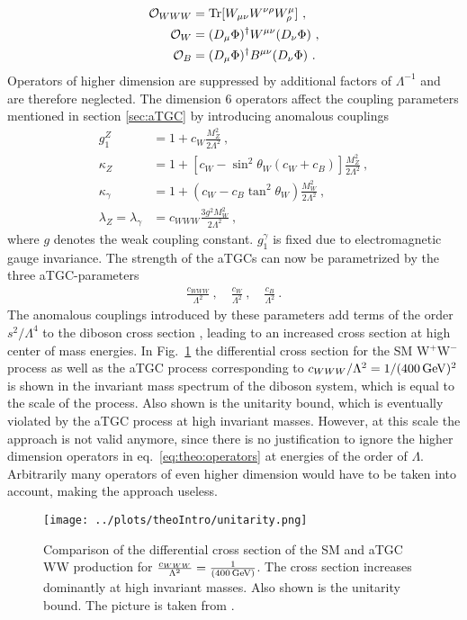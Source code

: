 \begin{align}
\mathcal{O}_{WWW} &= {\rm Tr}[W_{\mu\nu}W^{\nu\rho}W^\mu_\rho] ~, \\
\mathcal{O}_{W} &=  (D_\mu\Phi)^\dagger W^{\mu\nu}(D_\nu\Phi) ~, \\
\mathcal{O}_{B} &= (D_\mu\Phi)^\dagger B^{\mu\nu}(D_\nu\Phi) ~.
\end{align}
Operators of higher dimension are suppressed by additional factors of $\Lambda^{-1}$ and are therefore neglected. The dimension 6 operators affect the coupling parameters mentioned in section \ref{sec:aTGC} by introducing anomalous couplings
\begin{align}
g_1^Z &= 1 + c_W\frac{M_Z^2}{2\Lambda^2} ~, \\
\kappa_Z &= 1 + \left[ c_W - \sin^2\theta_W (c_W+c_B)\right] \frac{M_Z^2}{2\Lambda^2} ~, \\
\kappa_\gamma &= 1 + (c_W-c_B\tan^2\theta_W)\frac{M_W^2}{2\Lambda^2} ~, \\
\lambda_Z = \lambda_\gamma &= c_{WWW}\frac{3g^2M_W^2}{2\Lambda^2} ~, 
\end{align}
where $g$ denotes the weak coupling constant. $g_1^\gamma$ is fixed due to electromagnetic gauge invariance. The strength of the aTGCs can now be parametrized by the three aTGC-parameters
\begin{align}
\frac{c_{WWW}}{\Lambda^2} ~, \quad \frac{c_W}{\Lambda^2} ~, \quad \frac{c_B}{\Lambda^2} ~.
\end{align}
The anomalous couplings introduced by these parameters add terms of the order $s^2/\Lambda^4$ to the diboson cross section \cite{EFT}, leading to an increased cross section at high center of mass energies. In Fig.~\ref{fig:theo:unitarity} the differential cross section for the SM W$^+$W$^-$ process as well as the aTGC process corresponding to $c_{WWW}/\Lambda^2 = 1/(400 \, {\rm GeV})^{2}$ is shown in the invariant mass spectrum of the diboson system, which is equal to the scale of the process. Also shown is the unitarity bound, which is eventually violated by the aTGC process at high invariant masses. However, at this scale the approach is not valid anymore, since there is no justification to ignore the higher dimension operators in eq.~\ref{eq:theo:operators} at energies of the order of $\Lambda$. Arbitrarily many operators of even higher dimension would have to be taken into account, making the approach useless.\\
\begin{figure}
	\centering
	\texttt{[image: ../plots/theoIntro/unitarity.png]}
	\caption[Comparison of the differential cross section of the SM and aTGC WW production]{Comparison of the differential cross section of the SM and aTGC WW production for $\frac{c_{WWW}}{\Lambda^2}=\frac{1}{(400\,{\rm GeV})}$. The cross section increases dominantly at high invariant masses. Also shown is the unitarity bound. The picture is taken from \cite{EFT}.}
	\label{fig:theo:unitarity}
\end{figure}

